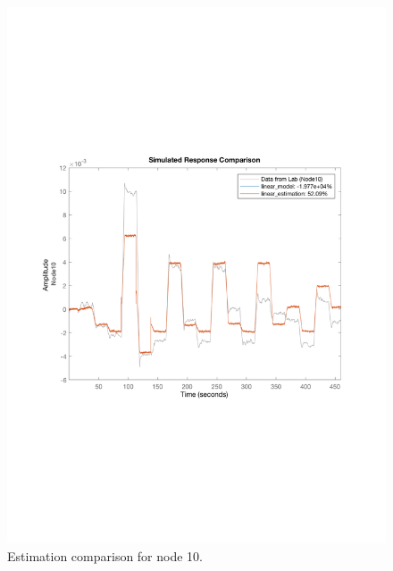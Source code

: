 \begin{figure}[H]
  \centering
  \begin{minipage}[b]{0.45\textwidth}
    \includegraphics[width=\textwidth]{report/pictures/Node10_estimation.pdf}
    \caption{Estimation comparison for node 10.}
  \end{minipage}
  \hfill
  \begin{minipage}[b]{0.45\textwidth}

\end{minipage}
\end{figure}

